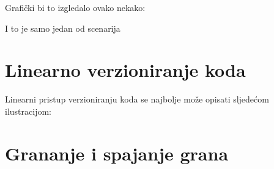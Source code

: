 Grafički bi to izgledalo ovako nekako:



I to je samo jedan od scenarija

\section*{Linearno verzioniranje koda}

Linearni pristup verzioniranju koda se najbolje može opisati sljedećom ilustracijom:



\section*{Grananje i spajanje grana}



